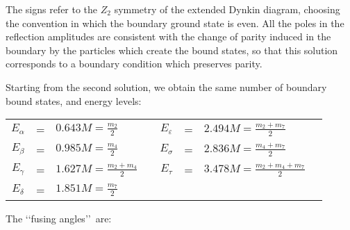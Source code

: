 \documentclass[a4paper,12pt]{report}
\begin{document}
\vspace{0.5cm}

The signs refer to the $Z_{2}$ symmetry of the extended Dynkin diagram, choosing the convention in which the
boundary ground state is even. All the poles in the reflection amplitudes are consistent with the change of parity
induced in the boundary by the particles which create the bound states, so that this solution corresponds to a
boundary condition which preserves parity.

\vspace {0.5cm}

Starting from the second solution, we obtain the same number of boundary bound states, and energy levels:

\begin{center}
\begin{tabular}{cclc|cclc|}
$E_{\alpha}$ &=& $0.643 M =\frac{m_{2}}{2}$ && $E_{\varepsilon}$ &=& $2.494 M =\frac{m_{2}+m_{7}}{2}$ \\
$E_{\beta}$ &=& $0.985 M =\frac{m_{4}}{2}$ && $E_{\sigma}$ &=& $2.836 M =\frac{m_{4}+m_{7}}{2}$ \\
$E_{\gamma}$ &=& $1.627 M =\frac{m_{2}+m_{4}}{2}$ && $E_{\tau}$ &=& $3.478 M =\frac{m_{2}+m_{4}+m_{7}}{2}$ \\
$E_{\delta}$ &=& $1.851 M =\frac{m_{7}}{2}$ && \\
\end{tabular}
\end{center}

\vspace{0.5cm}

The \lq\lq fusing angles\rq\rq \, are:
\end{document}
